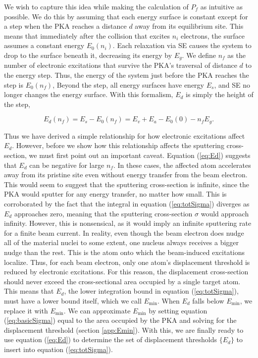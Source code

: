 \documentclass{article}
\begin{document}
We wish to capture this idea while making the calculation of $P_f$ as
intuitive as possible.
We do this by assuming that each energy surface is constant except for a step
when the PKA reaches a distance $d$ away from its equilibrium site.
This means that immediately after the collision that excites $n_i$ electrons,
the surface assumes a constant energy $E_0(n_i)$.
Each relaxation via SE causes the system to drop to the surface beneath it,
decreasing its energy by $E_g$.
We define $n_f$ as the number of electronic excitations that survive the PKA's
traversal of distance $d$ to the energy step.
Thus, the energy of the system just before the PKA reaches the step is
$E_0(n_f)$,
Beyond the step, all energy surfaces have energy $E_s$, and SE no longer
changes the energy surface. 
With this formalism, $E_d$ is simply the height of the step,

\begin{equation}
  E_d(n_f) = E_s - E_0(n_f) = E_v + E_a - E_0(0) - n_f E_g.
  \label{eq:Ed}
\end{equation}

Thus we have derived a simple relationship for how electronic excitations
affect $E_d$.
However, before we show how this relationship affects the sputtering
cross-section, we must first point out an important caveat.
Equation (\ref{eq:Ed}) suggests that $E_d$ can be negative for large $n_f$.
In these cases, the affected atom accelerates away from its pristine site even
without energy transfer from the beam electron.
This would seem to suggest that the sputtering cross-section is infinite, since
the PKA would sputter for any energy transfer, no matter how small.
This is corroborated by the fact that the integral in equation
(\ref{eq:totSigma}) diverges as $E_d$ approaches zero, meaning that the
sputtering cross-section $\sigma$ would approach infinity.
However, this is nonsensical, as it would imply an infinite sputtering rate for
a finite beam current.
In reality, even though the beam electron does nudge all of the material nuclei
to some extent, one nucleus always receives a bigger nudge than the rest.
This is the atom onto which the beam-induced excitations localize.
Thus, for each beam electron, only one atom's displacement threshold is reduced
by electronic excitations.
For this reason, the displacement cross-section should never exceed the
cross-sectional area occupied by a single target atom.
This means that $E_d$, the lower integration bound in equation
(\ref{eq:totSigma}), must have a lower bound itself, which we call
$E_\text{min}$.
When $E_d$ falls below $E_\text{min}$, we replace it with $E_\text{min}$.
We can approximate $E_\text{min}$ by setting equation (\ref{eq:basicSigma})
equal to the area occupied by the PKA and solving for the displacement
threshold (section \ref{app:Emin}).
With this, we are finally ready to use equation (\ref{eq:Ed}) to determine the
set of displacement thresholds $\{E_d\}$ to insert into equation
(\ref{eq:totSigma}).
\end{document}
